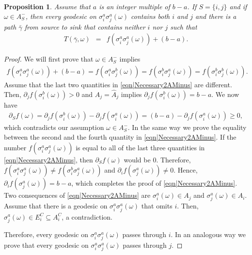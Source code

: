 \documentclass[reqno]{amsart}
\newtheorem{proposition}[theorem]{Proposition}
\begin{document}
\begin{proposition}\label{thm|Necessary2AMinus} 
Assume that $a$ is an integer multiple of $b-a$. If $S=\{i,j\}$ and if $\omega\in A_S^-$, then every geodesic on
$\sigma_i^a\sigma_j^a(\omega)$
contains both $i$ and $j$ and there is a path $\bar\gamma$ from source to sink that contains neither $i$ nor $j$ 
such that \begin{eqnarray}
T\left(\bar\gamma,\omega\right)&=&f\left(\sigma_i^a\sigma_j^a(\omega)\right)+(b-a). 
\label{eqn|AMinusBarGamma}
\end{eqnarray}
\end{proposition}
\begin{proof} We will first prove that $\omega\in A_S^-$ implies 
\begin{eqnarray}f\left(\sigma_i^a\sigma_j^a(\omega)\right)+(b-a)= f\left(\sigma_i^a\sigma_j^b(\omega)\right) = f\left(\sigma_i^b\sigma_j^a(\omega)\right) = f\left(\sigma_i^b\sigma_j^b(\omega)\right). \label{eqn|Necessary2AMinus}
\end{eqnarray}
Assume that the last two quantities in \eqref{eqn|Necessary2AMinus} are different. Then, 
$\partial_jf\left(\sigma_i^b(\omega)\right)>0$ and $A_j=\hat A_j$ implies $\partial_jf\left(\sigma_i^b(\omega)\right)=b-a$. We now have 
\begin{eqnarray*}\partial_Sf(\omega)=\partial_jf\left(\sigma_i^b(\omega)\right)-\partial_jf\left(\sigma_i^a(\omega)\right)
=(b-a)-\partial_jf\left(\sigma_i^a(\omega)\right)\geq 0, \end{eqnarray*}
which contradicts our assumption $\omega\in A_S^-$. In the same way we prove the equality between the second and the fourth quantity in \eqref{eqn|Necessary2AMinus}. 
If the number $f\left(\sigma_i^a\sigma_j^a(\omega)\right)$ is equal to all of the last three quantities in \eqref{eqn|Necessary2AMinus}, then $\partial_Sf(\omega)$ would be $0$. Therefore,
$f\left(\sigma_i^a\sigma_j^a(\omega)\right)\neq f\left(\sigma_i^b\sigma_j^a(\omega)\right)$ and $\partial_if\left(\sigma_j^a(\omega)\right)\neq 0$. Hence, $\partial_if\left(\sigma_j^a(\omega)\right)=b-a$, which completes the proof of \eqref{eqn|Necessary2AMinus}.
Two consequences of \eqref{eqn|Necessary2AMinus} are $\sigma_i^a(\omega)\in A_j$ and $\sigma_j^a(\omega)\in A_i$.
Assume that there is a geodesic on $\sigma_i^a\sigma_j^a(\omega)$ that omits $i$. Then, 
$\sigma_j^a(\omega)\in E_i^C\subseteq A_i^C$, a contradiction. 

Therefore, every geodesic on $\sigma_i^a\sigma_j^a(\omega)$ passes through $i$. In an analogous way we prove that every geodesic on $\sigma_i^a\sigma_j^a(\omega)$ passes through $j$. 


\end{proof}
\end{document}
